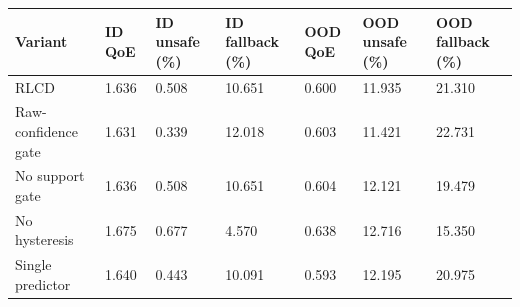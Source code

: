 \begin{tabular}{lllllll}
\toprule
Variant & ID QoE & ID unsafe (\%) & ID fallback (\%) & OOD QoE & OOD unsafe (\%) & OOD fallback (\%) \\
\midrule
RLCD & 1.636 & 0.508 & 10.651 & 0.600 & 11.935 & 21.310 \\
Raw-confidence gate & 1.631 & 0.339 & 12.018 & 0.603 & 11.421 & 22.731 \\
No support gate & 1.636 & 0.508 & 10.651 & 0.604 & 12.121 & 19.479 \\
No hysteresis & 1.675 & 0.677 & 4.570 & 0.638 & 12.716 & 15.350 \\
Single predictor & 1.640 & 0.443 & 10.091 & 0.593 & 12.195 & 20.975 \\
\bottomrule
\end{tabular}
